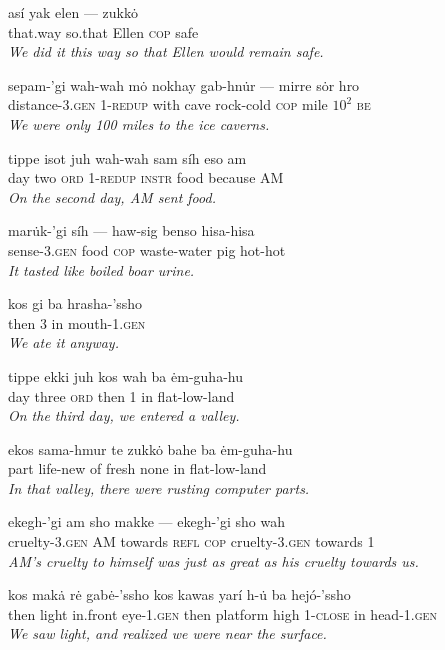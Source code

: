 \documentclass{article}[10pt]
\begin{document}
\begin{exe}
\ex
\gll as\'{i} yak elen --- zukk\.{o}\\
that.way so.that Ellen \textsc{cop} safe\\
\trans \emph{We did it this way so that Ellen would remain safe.}


\ex
\gll sepam-'gi wah-wah m\.{o} nokhay gab-hn\.{u}r --- mirre s\.{o}r hro\\
distance-3.\textsc{gen} 1-\textsc{redup} with cave rock-cold \textsc{cop} mile $10^2$ \textsc{be}\\
\trans \emph{We were only 100 miles to the ice caverns.}

\ex
\gll tippe isot juh wah-wah sam s\'{i}h eso am\\
day two \textsc{ord} 1-\textsc{redup} \textsc{instr} food because AM\\
\trans \emph{On the second day, AM sent food.}

\ex
\gll mar\.{u}k-'gi s\'{i}h --- haw-sig benso hisa-hisa\\
sense-3.\textsc{gen} food \textsc{cop} waste-water pig hot-hot\\
\trans \emph{It tasted like boiled boar urine.}

\ex
\gll kos gi ba hrasha-'ssho\\
then 3 in mouth-1.\textsc{gen}\\
\trans \emph{We ate it anyway.}


\ex
\gll tippe ekki juh kos wah ba \.{e}m-guha-hu\\
day three \textsc{ord} then 1 in flat-low-land\\
\trans \emph{On the third day, we entered a valley.}

\ex
\gll ekos sama-hmur te zukk\.{o} bahe ba \.{e}m-guha-hu\\
part life-new of fresh none in flat-low-land\\
\trans \emph{In that valley, there were rusting computer parts.}

\ex
\gll ekegh-'gi am sho makke --- ekegh-'gi sho wah\\
cruelty-3.\textsc{gen} AM towards \textsc{refl} \textsc{cop} cruelty-3.\textsc{gen} towards 1\\
\trans \emph{AM's cruelty to himself was just as great as his cruelty towards us.}

\ex
\gll kos mak\.{a} r\.{e} gab\.{e}-'ssho kos kawas yar\'{i} h-\.{u} ba hej\'{o}-'ssho\\
then light in.front eye-1.\textsc{gen} then platform high 1-\textsc{close} in head-1.\textsc{gen}\\
\trans \emph{We saw light, and realized we were near the surface.}


\end{exe}
\end{document}
